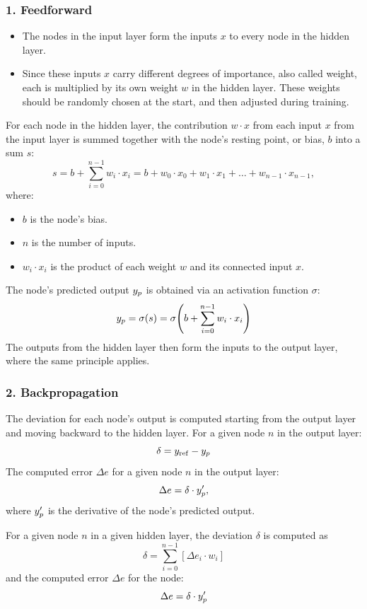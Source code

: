 \subsubsection{1. Feedforward}
\begin{itemize}
  \item The nodes in the input layer form the inputs $x$ to every node in the hidden layer.
  \item Since these inputs $x$ carry different degrees of importance, also called weight, each is
    multiplied by its own weight $w$ in the hidden layer. These weights should be randomly chosen at
    the start, and then adjusted during training.
\end{itemize}
For each node in the hidden layer, the contribution $w \cdot x$ from each input $x$ from the input
layer is summed together with the node's resting point, or bias, $b$ into a sum $s$:
\[
  s = b + \sum_{i=0}^{n-1} w_i \cdot x_i
    = b + w_0 \cdot x_0 + w_1 \cdot x_1 + \dots + w_{n-1} \cdot x_{n-1},
\]
where:
\begin{itemize}
  \item $b$ is the node's bias.
  \item $n$ is the number of inputs.
  \item $w_i \cdot x_i$ is the product of each weight $w$ and its connected input $x$.
\end{itemize}
The node's predicted output $y_{p}$ is obtained via an activation function $\sigma$:
\[
  y_{p} = \sigma(s) = \sigma\!\left(b + \sum_{i=0}^{n-1} w_i \cdot x_i\right)
\]
The outputs from the hidden layer then form the inputs to the output layer, where the same
principle applies.

\subsubsection{2. Backpropagation}
The deviation for each node's output is computed starting from the output layer and moving backward
to the hidden layer. For a given node $n$ in the output layer:
\[
  \delta = y_{\mathrm{ref}} - y_{p}
\]
The computed error $\Delta e$ for a given node $n$ in the output layer:
\[
  \Delta e = \delta \cdot y_{p}',
\]
where $y_{p}'$ is the derivative of the node's predicted output.

For a given node $n$ in a given hidden layer, the deviation $\delta$ is computed as
\[
  \delta = \sum_{i=0}^{n-1} \left[\Delta e_i \cdot w_i\right]
\]
and the computed error $\Delta e$ for the node:
\[
  \Delta e = \delta \cdot y_{p}'
\]

